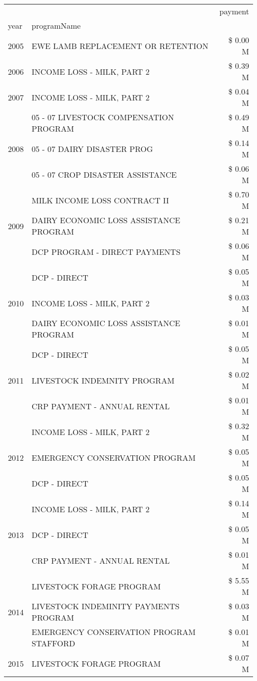 \begin{tabular}{llr}
\toprule
 &  & payment \\
year & programName &  \\
\midrule
2005 & EWE LAMB REPLACEMENT OR RETENTION & \$ 0.00 M \\
\cline{1-3}
2006 & INCOME LOSS - MILK, PART 2 & \$ 0.39 M \\
\cline{1-3}
2007 & INCOME LOSS - MILK, PART 2 & \$ 0.04 M \\
\cline{1-3}
\multirow[t]{3}{*}{2008} & 05 - 07 LIVESTOCK COMPENSATION PROGRAM & \$ 0.49 M \\
 & 05 - 07 DAIRY DISASTER PROG & \$ 0.14 M \\
 & 05 - 07 CROP DISASTER ASSISTANCE & \$ 0.06 M \\
\cline{1-3}
\multirow[t]{3}{*}{2009} & MILK INCOME LOSS CONTRACT II & \$ 0.70 M \\
 & DAIRY ECONOMIC LOSS ASSISTANCE PROGRAM & \$ 0.21 M \\
 & DCP PROGRAM - DIRECT PAYMENTS & \$ 0.06 M \\
\cline{1-3}
\multirow[t]{3}{*}{2010} & DCP - DIRECT & \$ 0.05 M \\
 & INCOME LOSS - MILK, PART 2 & \$ 0.03 M \\
 & DAIRY ECONOMIC LOSS ASSISTANCE PROGRAM & \$ 0.01 M \\
\cline{1-3}
\multirow[t]{3}{*}{2011} & DCP - DIRECT & \$ 0.05 M \\
 & LIVESTOCK INDEMNITY PROGRAM & \$ 0.02 M \\
 & CRP PAYMENT - ANNUAL RENTAL & \$ 0.01 M \\
\cline{1-3}
\multirow[t]{3}{*}{2012} & INCOME LOSS - MILK, PART 2 & \$ 0.32 M \\
 & EMERGENCY CONSERVATION PROGRAM & \$ 0.05 M \\
 & DCP - DIRECT & \$ 0.05 M \\
\cline{1-3}
\multirow[t]{3}{*}{2013} & INCOME LOSS - MILK, PART 2 & \$ 0.14 M \\
 & DCP - DIRECT & \$ 0.05 M \\
 & CRP PAYMENT - ANNUAL RENTAL & \$ 0.01 M \\
\cline{1-3}
\multirow[t]{3}{*}{2014} & LIVESTOCK FORAGE PROGRAM & \$ 5.55 M \\
 & LIVESTOCK INDEMINITY PAYMENTS PROGRAM & \$ 0.03 M \\
 & EMERGENCY CONSERVATION PROGRAM STAFFORD & \$ 0.01 M \\
\cline{1-3}
\multirow[t]{3}{*}{2015} & LIVESTOCK FORAGE PROGRAM & \$ 0.07 M \\

\end{tabular}
